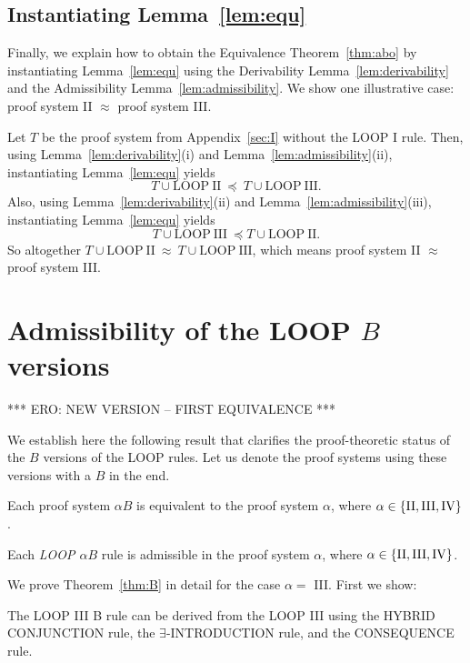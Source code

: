 \documentclass[manuscript, screen, review]{acmart}
\begin{document}
\subsection{Instantiating Lemma~\ref{lem:equ}}
\label{subsec:instantiate}

Finally, we explain how to obtain the Equivalence Theorem~\ref{thm:abo} by instantiating Lemma~\ref{lem:equ}
using the Derivability Lemma~\ref{lem:derivability} and the Admissibility Lemma~\ref{lem:admissibility}.
We show one illustrative case: proof system II $\approx$ proof system III.

Let $T$ be the proof system from Appendix~\ref{sec:I} without the LOOP I rule.
Then, using Lemma~\ref{lem:derivability}(i) and Lemma~\ref{lem:admissibility}(ii), 
instantiating Lemma~\ref{lem:equ} yields
\[
 T \cup \mathrm{LOOP\ II}\ \preceq\ T \cup \mathrm{LOOP\ III}.
\]
Also, using Lemma~\ref{lem:derivability}(ii) and Lemma~\ref{lem:admissibility}(iii), 
instantiating Lemma~\ref{lem:equ} yields
\[
 T \cup \mathrm{LOOP\ III}\ \preceq T \cup \mathrm{LOOP\ II}.
\]
So altogether $T \cup \mathrm{LOOP\ II}\ \approx\ T \cup \mathrm{LOOP\ III}$,
which means proof system II $\approx$ proof system III.



\section{Admissibility of the LOOP $B$ versions}
\label{sec:B}

*** ERO: NEW VERSION -- FIRST EQUIVALENCE ***

We establish here the following result that clarifies the
proof-theoretic status of the $B$ versions of the LOOP rules.
Let us denote the proof systems using these versions with a $B$ in the end.

\begin{theorem}\label{thm:B}
  Each proof system $\alpha B$ is equivalent to the proof system
  $\alpha$, where $\alpha \in \{{\rm II, III, IV}\}$.
\end{theorem}

\begin{corollary}
  Each {\em LOOP $\alpha B$} rule is admissible in the proof system
  $\alpha$, where $\alpha \in \{{\rm II, III, IV}\}$.
\end{corollary}

We prove Theorem~\ref{thm:B} in detail for the case $\alpha=$ III.
First we show:

\begin{lemma}\label{lem:IIIB}
  The {\rm LOOP III} B rule can be derived from the {\rm LOOP III} using
  the {\rm HYBRID CONJUNCTION} rule,
  the {\rm $\exists$-INTRODUCTION} rule, and the {\rm CONSEQUENCE} rule.
\end{lemma}
\end{document}
